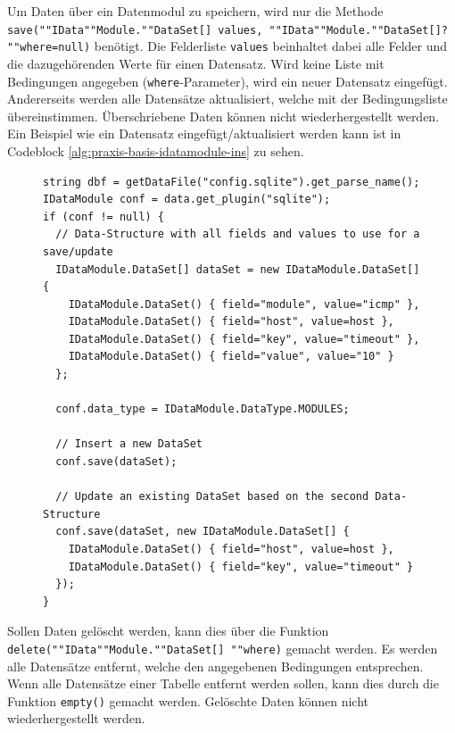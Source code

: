 Um Daten \"uber ein Datenmodul zu speichern, wird nur die Methode \texttt{save(""IData""Module.""DataSet[] values, ""IData""Module.""DataSet[]? ""where=null)} ben\"otigt. Die Felderliste \texttt{values} beinhaltet dabei alle Felder und die dazugeh\"orenden Werte f\"ur einen Datensatz. Wird keine Liste mit Bedingungen angegeben (\texttt{where}-Parameter), wird ein neuer Datensatz eingef\"ugt. Andererseits werden alle Datens\"atze aktualisiert, welche mit der Bedingungsliste \"ubereinstimmen. \"Uberschriebene Daten k\"onnen nicht wiederhergestellt werden. Ein Beispiel wie ein Datensatz eingef\"ugt/aktualisiert werden kann ist in Codeblock \ref{alg:praxis-basis-idatamodule-ins} zu sehen.

\begin{figure}[h]
 \lstset{language=[ISO]C++}
 \begin{lstlisting}[label=alg:praxis-basis-idatamodule-ins,caption={[Beispiel zum Speichern von Daten \"uber ein Datenmodul]Beispiel: Zuerst wird ein neuer Datensatz in die Modules-Tabelle eingef\"ugt. Anschliessend werden alle Datens\"atze aktualisiert, welche im Feld "`host"' und "`key"' entsprechende Werte haben.}]
string dbf = getDataFile("config.sqlite").get_parse_name();
IDataModule conf = data.get_plugin("sqlite");
if (conf != null) {
  // Data-Structure with all fields and values to use for a save/update
  IDataModule.DataSet[] dataSet = new IDataModule.DataSet[] {
    IDataModule.DataSet() { field="module", value="icmp" },
    IDataModule.DataSet() { field="host", value=host },
    IDataModule.DataSet() { field="key", value="timeout" },
    IDataModule.DataSet() { field="value", value="10" }
  };

  conf.data_type = IDataModule.DataType.MODULES;

  // Insert a new DataSet
  conf.save(dataSet);

  // Update an existing DataSet based on the second Data-Structure
  conf.save(dataSet, new IDataModule.DataSet[] {
    IDataModule.DataSet() { field="host", value=host },
    IDataModule.DataSet() { field="key", value="timeout" }
  });
}
 \end{lstlisting}
\end{figure}

Sollen Daten gel\"oscht werden, kann dies \"uber die Funktion \texttt{delete(""IData""Module.""DataSet[] ""where)} gemacht werden. Es werden alle Datens\"atze entfernt, welche den angegebenen Bedingungen entsprechen. Wenn alle Datens\"atze einer Tabelle entfernt werden sollen, kann dies durch die Funktion \texttt{empty()} gemacht werden. Gel\"oschte Daten k\"onnen nicht wiederhergestellt werden.

